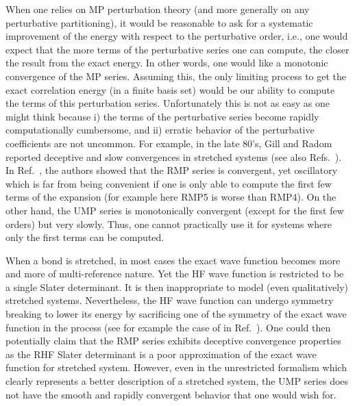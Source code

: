 \documentclass[aps,prb,reprint,noshowkeys,superscriptaddress]{revtex4-1}
\newcommand{\latin}[1]{#1}
\newcommand{\ie}{\latin{i.e.}}
\begin{document}
When one relies on MP perturbation theory (and more generally on any perturbative partitioning), it would be reasonable to ask for a systematic improvement of the energy with respect to the perturbative order, \ie, one would expect that the more terms of the perturbative series one can compute, the closer the result from the exact energy.
In other words, one would like a monotonic convergence of the MP series. Assuming this, the only limiting process to get the exact correlation energy (in a finite basis set) would be our ability to compute the terms of this perturbation series.
Unfortunately this is not as easy as one might think because i) the terms of the perturbative series become rapidly computationally cumbersome, and ii) erratic behavior of the perturbative coefficients are not uncommon. For example, in the late 80's, Gill and Radom reported deceptive and slow convergences in stretched systems \cite{Gill_1986, Gill_1988} (see also Refs.~). 
In Ref.~, the authors showed that the RMP series is convergent, yet oscillatory which is far from being convenient if one is only able to compute the first few terms of the expansion (for example here RMP5 is worse than RMP4). 
On the other hand, the UMP series is monotonically convergent (except for the first few orders) but very slowly. 
Thus, one cannot practically use it for systems where only the first terms can be computed.

When a bond is stretched, in most cases the exact wave function becomes more and more of multi-reference nature. 
Yet the HF wave function is restricted to be a single Slater determinant.
It is then inappropriate to model (even qualitatively) stretched systems. Nevertheless, the HF wave function can undergo symmetry breaking to lower its energy by sacrificing one of the symmetry of the exact wave function in the process (see for example the case of  in Ref.~). 
One could then potentially claim that the RMP series exhibits deceptive convergence properties as the RHF Slater determinant is a poor approximation of the exact wave function for stretched system. However, even in the unrestricted formalism which clearly represents a better description of a stretched system, the UMP series does not have the smooth and rapidly convergent behavior that one would wish for. 
\end{document}
